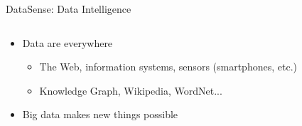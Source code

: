 \begin{frame}{DataSense: Data Intelligence}
  \begin{columns}
    \begin{column}{7cm}
      
      \begin{itemize}
      \item Data are everywhere

        \begin{itemize}
        \item The Web, information systems, sensors (smartphones, etc.)
        \item Knowledge Graph, Wikipedia, WordNet...
        \end{itemize}
      \item Big data makes new things possible


\end{itemize}
\end{column}
\end{columns}
\end{frame}
